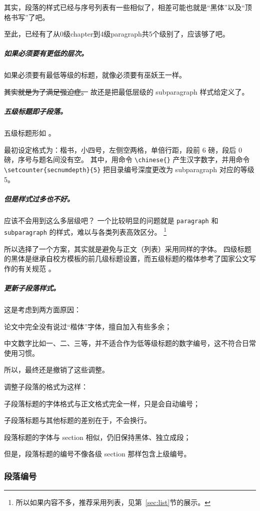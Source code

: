 \documentclass[../Main/thesis]{subfiles}
\begin{document}
其实，段落的样式已经与序号列表有一些相似了，相差可能也就是“黑体”以及“顶格书写”了吧。

至此，已经有了从0级chapter到4级paragraph共5个级别了，应该够了吧。

\subparagraph{如果必须要有更低的层次。\\}
如果必须要有最低等级的标题，就像必须要有巫妖王一样。

\sout{其实就是为了满足强迫症。}
故还是把最低层级的 subparagraph 样式给定义了。

\subparagraph{五级标题即子段落。}
五级标题形如 。

最初设定格式为：楷书，小四号，左侧空两格，单倍行距，段前 6 磅，段后 0 磅，序号与题名间没有空。
其中，用命令 \verb|\chinese{}| 产生汉字数字，并用命令 \verb|\setcounter{secnumdepth}{5}| 把目录编号深度更改为 subparagraph 对应的等级 5。

\subparagraph{但是样式过多也不好。}
应该不会用到这么多层级吧？
一个比较明显的问题就是 \verb|paragraph| 和 \verb|subparagraph| 的样式，难以与各类列表高效区分。
\footnote{所以如果内容不多，推荐采用列表，见第~\ref{sec:list}节的展示。}

所以选择了一个方案，其实就是避免与正文（列表）采用同样的字体。
四级标题的黑体是继承自校方模板的前几级标题设置，而五级标题的楷体参考了国家公文写作的有关规范 \cite{GBT9704}。

\subparagraph{更新子段落样式。}
这是考虑到两方面原因：
\begin{inlinecn}
  \item 论文中完全没有说过“楷体”字体，擅自加入有些多余；
  \item 中文数字比如一、二、三等，并不适合作为低等级标题的数字编号，这不符合日常使用习惯。
\end{inlinecn}
所以，最终还是撤销了这些调整。

调整子段落的格式为这样：
\begin{inline}
  \item 子段落标题的字体格式与正文格式完全一样，只是会自动编号；
  \item 子段落标题与其他标题的差别在于，不会换行。
  \item 段落标题的字体与 section 相似，仍旧保持黑体、独立成段；
  \item 但是，段落标题的编号不像各级 section 那样包含上级编号。
\end{inline}

\subsubsection{段落编号}
\end{document}

